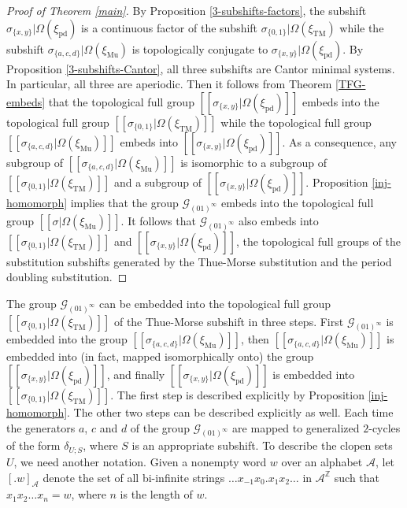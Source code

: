 \documentclass[12pt]{article}
\theoremstyle{definition}
\def\bZ{\mathbb{Z}}
\def\cA{\mathcal{A}}
\def\cG{\mathcal{G}}
\def\de{\delta}
\def\si{\sigma}
\def\Om{\Omega}
\def\xiTM{\xi_{\mathrm{TM}}}
\def\xipd{\xi_{\mathrm{pd}}}
\def\xiGE{\xi_{\mathrm{Mu}}}
\begin{document}
\begin{proof}[Proof of Theorem \ref{main}]
By Proposition \ref{3-subshifts-factors}, the subshift 
$\si_{\{x,y\}}|\Om(\xipd)$ is a continuous factor of the subshift 
$\si_{\{0,1\}}|\Om(\xiTM)$ while the subshift $\si_{\{a,c,d\}}|\Om(\xiGE)$ 
is topologically conjugate to $\si_{\{x,y\}}|\Om(\xipd)$.  By Proposition 
\ref{3-subshifts-Cantor}, all three subshifts are Cantor minimal systems.  
In particular, all three are aperiodic.  Then it follows from Theorem 
\ref{TFG-embeds} that the topological full group 
$[[\si_{\{x,y\}}|\Om(\xipd)]]$ embeds into the topological full group 
$[[\si_{\{0,1\}}|\Om(\xiTM)]]$ while the
topological full group $[[\si_{\{a,c,d\}}|\Om(\xiGE)]]$ embeds into 
$[[\si_{\{x,y\}}|\Om(\xipd)]]$.  As a consequence, any subgroup of 
$[[\si_{\{a,c,d\}}|\Om(\xiGE)]]$ is isomorphic to a subgroup of 
$[[\si_{\{0,1\}}|\Om(\xiTM)]]$ and a subgroup of 
$[[\si_{\{x,y\}}|\Om(\xipd)]]$.  Proposition \ref{inj-homomorph} implies 
that the group $\cG_{(01)^\infty}$ embeds into the topological full group 
$[[\si|\Omega(\xiGE)]]$.  It follows that $\cG_{(01)^\infty}$ also embeds 
into $[[\si_{\{0,1\}}|\Om(\xiTM)]]$ and $[[\si_{\{x,y\}}|\Om(\xipd)]]$, the 
topological full groups of the substitution subshifts generated by the 
Thue-Morse substitution and the period doubling substitution.
\end{proof}

The group $\cG_{(01)^\infty}$ can be embedded into the topological full 
group $[[\si_{\{0,1\}}|\Om(\xiTM)]]$ of the Thue-Morse subshift in three 
steps.  First $\cG_{(01)^\infty}$ is embedded into the group 
$[[\si_{\{a,c,d\}}|\Om(\xiGE)]]$, then $[[\si_{\{a,c,d\}}|\Om(\xiGE)]]$ is 
embedded into (in fact, mapped isomorphically onto) the group 
$[[\si_{\{x,y\}}|\Om(\xipd)]]$, and finally $[[\si_{\{x,y\}}|\Om(\xipd)]]$ 
is embedded into $[[\si_{\{0,1\}}|\Om(\xiTM)]]$.  The first step is 
described explicitly by Proposition \ref{inj-homomorph}.  The other two 
steps can be described explicitly as well.  Each time the generators $a$, 
$c$ and $d$ of the group $\cG_{(01)^\infty}$ are mapped to generalized 
$2$-cycles of the form $\de_{U;S}$, where $S$ is an appropriate subshift.  
To describe the clopen sets $U$, we need another notation.  Given a 
nonempty word $w$ over an alphabet $\cA$, let $[.w]_{\cA}$ denote the set 
of all bi-infinite strings $\ldots x_{-1}x_0.x_1x_2\ldots$ in $\cA^{\bZ}$ 
such that $x_1x_2\ldots x_n=w$, where $n$ is the length of $w$.
\end{document}
